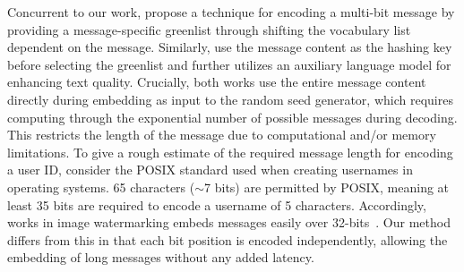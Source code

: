 Concurrent to our work, \citet{fernandez2023three} propose a technique for encoding a multi-bit message by providing a message-specific greenlist through shifting the vocabulary list dependent on the message. Similarly, \citet{wang2023towards} use the message content as the hashing key before selecting the greenlist and further utilizes an auxiliary language model for enhancing text quality. Crucially, both works use the entire message content directly during embedding as input to the random seed generator, which requires computing through the exponential number of possible messages during decoding. This restricts the length of the message due to computational and/or memory limitations. To give a rough estimate of the required message length for encoding a user ID,  consider the POSIX \citep{posix} standard used when creating usernames in operating systems. 65 characters ($\sim$7 bits) are permitted by POSIX, meaning at least 35 bits are required to encode a username of 5 characters. Accordingly, works in image watermarking embeds messages easily over 32-bits~\citep{zhu2018hidden, zhao2023recipe, fernandez2023stable}. Our method differs from this in that each bit position is encoded independently, allowing the embedding of long messages without any added latency. 